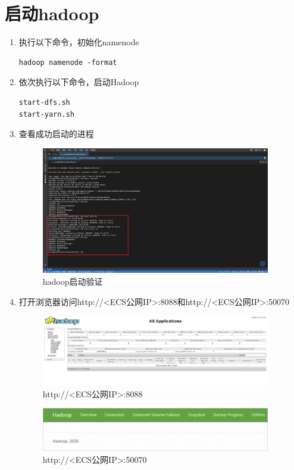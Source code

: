 \documentclass{article}
\begin{document}
\section{启动hadoop}
\begin{enumerate}
    \item 执行以下命令，初始化namenode
    \begin{lstlisting}
hadoop namenode -format
    \end{lstlisting}
    \item 依次执行以下命令，启动Hadoop
    \begin{lstlisting}
start-dfs.sh
start-yarn.sh
    \end{lstlisting}
    \item 查看成功启动的进程
    \begin{figure}[htp]
        \centering
        \includegraphics[width=10cm]{hadoop启动验证}
        \caption{hadoop启动验证}
        \label{fig:aa}
    \end{figure}
    \item 打开浏览器访问http://<ECS公网IP>:8088和http://<ECS公网IP>:50070
    \newpage
    \begin{figure}[htp]
        \centering
        \includegraphics[width=10cm]{8088port}
        \caption{http://<ECS公网IP>:8088}
        \label{fig:aa}
    \end{figure}
    \begin{figure}[htp]
        \centering
        \includegraphics[width=10cm]{50070port}
        \caption{http://<ECS公网IP>:50070}
        \label{fig:aa}
    \end{figure}
\end{enumerate}
\end{document}
